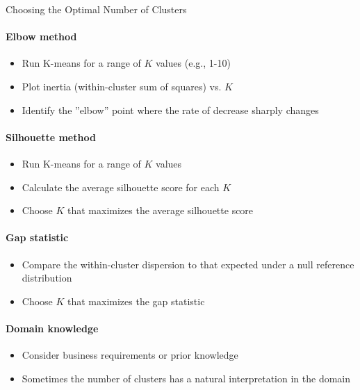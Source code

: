 \begin{KR}{Choosing the Optimal Number of Clusters}
\paragraph{Elbow method}
\begin{itemize}
    \item Run K-means for a range of $K$ values (e.g., 1-10)
    \item Plot inertia (within-cluster sum of squares) vs. $K$
    \item Identify the ''elbow'' point where the rate of decrease sharply changes
\end{itemize}

\paragraph{Silhouette method}
\begin{itemize}
    \item Run K-means for a range of $K$ values
    \item Calculate the average silhouette score for each $K$
    \item Choose $K$ that maximizes the average silhouette score
\end{itemize}

\paragraph{Gap statistic}
\begin{itemize}
    \item Compare the within-cluster dispersion to that expected under a null reference distribution
    \item Choose $K$ that maximizes the gap statistic
\end{itemize}

\paragraph{Domain knowledge}
\begin{itemize}
    \item Consider business requirements or prior knowledge
    \item Sometimes the number of clusters has a natural interpretation in the domain
\end{itemize}
\end{KR}

\raggedcolumns
\columnbreak

